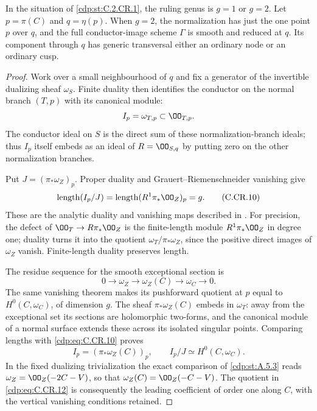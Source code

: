 
\begin{proposition}\label{cdp:st:C.2.CR.2}
In the situation of \ref{cdp:st:C.2.CR.1}, the ruling genus is $g=1$ or
$g=2$. Let $p=\pi(C)$ and $q=\eta(p)$. When $g=2$, the
normalization has just the one point $p$ over $q$, and the
full conductor-image scheme $\Gamma$ is smooth and reduced
at $q$. Its component through $q$ has generic transversal
either an ordinary node or an ordinary cusp.
\end{proposition}
\begin{proof}
Work over a small neighbourhood of $q$ and fix a generator
of the invertible dualizing sheaf $\omega_S$. Finite
duality then identifies the conductor on the normal branch
$(T,p)$ with its canonical module:
\[
 I_p=\omega_{T,p}\subset\OO_{T,p}.
\]
The conductor ideal on $S$ is the direct sum of these
normalization-branch ideals; thus $I_p$ itself embeds
as an ideal of $R=\OO_{S,q}$ by putting zero on the other
normalization branches.

Put $J=(\pi_*\omega_Z)_p$. Proper duality and
Grauert--Riemenschneider vanishing give
\[
 \operatorname{length}(I_p/J)
   =\operatorname{length}(R^1\pi_*\OO_Z)_p=g.
 \tag{C.CR.10}\label{cdp:eq:C.CR.10}
\]
These are the analytic duality and vanishing maps described
in \cite[Sections~2.2.2--2.2.5]{vanStraten1987}.
For precision, the defect of $\OO_T\to R\pi_*\OO_Z$ is
the finite-length module $R^1\pi_*\OO_Z$ in degree one;
duality turns it into the quotient
$\omega_T/\pi_*\omega_Z$, since the positive direct
images of $\omega_Z$ vanish. Finite-length duality
preserves length.

The residue sequence for the smooth exceptional section is
\[
 0\longrightarrow\omega_Z\longrightarrow\omega_Z(C)
   \longrightarrow\omega_C\longrightarrow0 .
 \tag{C.CR.11}\label{cdp:eq:C.CR.11}
\]
The same vanishing theorem makes its pushforward quotient
at $p$ equal to $H^0(C,\omega_C)$, of dimension $g$.
The sheaf $\pi_*\omega_Z(C)$ embeds in $\omega_T$:
away from the exceptional set its sections are holomorphic
two-forms, and the canonical module of a normal surface
extends these across its isolated singular points.
Comparing lengths with \eqref{cdp:eq:C.CR.10} proves
\[
 I_p=(\pi_*\omega_Z(C))_p,\qquad
 I_p/J\simeq H^0(C,\omega_C).
 \tag{C.CR.12}\label{cdp:eq:C.CR.12}
\]
In the fixed dualizing trivialization the exact comparison
of \ref{cdp:st:A.5.3} reads
$\omega_Z=\OO_Z(-2C-V)$, so that
$\omega_Z(C)=\OO_Z(-C-V)$. The quotient in \eqref{cdp:eq:C.CR.12}
is consequently the leading coefficient of order one
along $C$, with the vertical vanishing conditions retained.


\end{proof}
